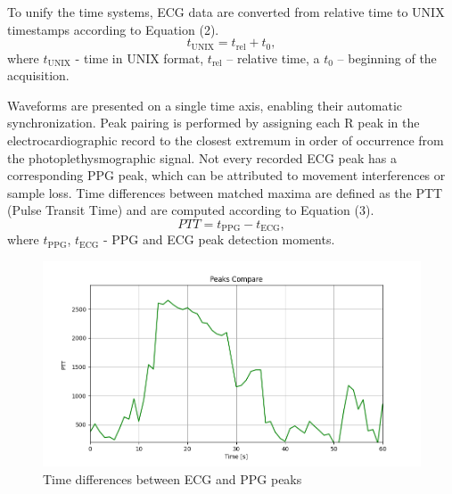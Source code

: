 \documentclass[journal]{IEEEtran}
\begin{document}
To unify the time systems, ECG data are converted from relative time to UNIX timestamps according to Equation (2).
\begin{equation}
t_{\mathrm{UNIX}} = t_{\mathrm{rel}} + t_{0},
\end{equation}
where $t_{\mathrm{UNIX}}$ - time in UNIX format, $t_{\mathrm{rel}}$ – relative time, a $t_{0}$ – beginning of the acquisition.

Waveforms are presented on a single time axis, enabling their automatic synchronization. Peak pairing is performed by assigning each R peak in the electrocardiographic record to the closest extremum in order of occurrence from the photoplethysmographic signal. Not every recorded ECG peak has a corresponding PPG peak, which can be attributed to movement interferences or sample loss. Time differences between matched maxima are defined as the PTT (Pulse Transit Time) and are computed according to Equation (3).
\begin{equation}
PTT = t_{\mathrm{PPG}} - t_{\mathrm{ECG}},
\end{equation}
where $t_{\mathrm{PPG}}$, $t_{\mathrm{ECG}}$ - PPG and ECG peak detection moments. 

\newpage
\begin{figure}[htbp]
    \centering
    \includegraphics[width=1.0\linewidth]{Peaks_compare.png}
   \caption{Time differences between ECG and PPG peaks}%
    \label{fig:PTT}
\end{figure}
\end{document}
